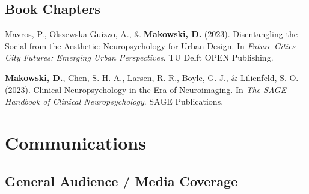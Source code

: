 \documentclass[11pt,a4paper,]{awesome-cv}
\begin{document}
\normalsize

\subsection{Book Chapters}\label{book-chapters}

\scriptsize

Mavros, P., Olszewska-Guizzo, A., \& \textbf{Makowski, D.} (2023).
\href{https://www.researchgate.net/publication/370953123_Disentangling_the_Social_from_the_Aesthetic_Neuropsychology_for_Urban_Design}{Disentangling
the Social from the Aesthetic: Neuropsychology for Urban Design}. In
\emph{Future Cities---City Futures: Emerging Urban Perspectives}. TU
Delft OPEN Publishing.

\textbf{Makowski, D.}, Chen, S. H. A., Larsen, R. R., Boyle, G. J., \&
Lilienfeld, S. O. (2023).
\href{https://uk.sagepub.com/en-gb/eur/the-sage-handbook-of-clinical-neuropsychology/book270076}{Clinical
Neuropsychology in the Era of Neuroimaging}. In \emph{The SAGE Handbook
of Clinical Neuropsychology}. SAGE Publications.

\normalsize

\section{Communications}\label{communications}

\subsection{General Audience / Media
Coverage}\label{general-audience-media-coverage}

\footnotesize
\end{document}
